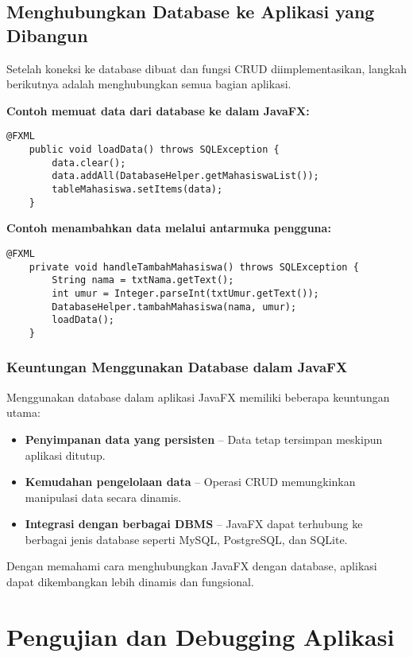 \subsection{Menghubungkan Database ke Aplikasi yang Dibangun}

Setelah koneksi ke database dibuat dan fungsi CRUD diimplementasikan, langkah berikutnya adalah menghubungkan semua bagian aplikasi.

\textbf{Contoh memuat data dari database ke dalam JavaFX:}
\begin{lstlisting}[style=JavaStyle, caption=Memuat data dari database ke TableView]
	@FXML
	public void loadData() throws SQLException {
		data.clear();
		data.addAll(DatabaseHelper.getMahasiswaList());
		tableMahasiswa.setItems(data);
	}
\end{lstlisting}

\textbf{Contoh menambahkan data melalui antarmuka pengguna:}
\begin{lstlisting}[style=JavaStyle, caption=Menambahkan data melalui UI]
	@FXML
	private void handleTambahMahasiswa() throws SQLException {
		String nama = txtNama.getText();
		int umur = Integer.parseInt(txtUmur.getText());
		DatabaseHelper.tambahMahasiswa(nama, umur);
		loadData();
	}
\end{lstlisting}

\subsubsection{Keuntungan Menggunakan Database dalam JavaFX}

Menggunakan database dalam aplikasi JavaFX memiliki beberapa keuntungan utama:
\begin{itemize}
	\item \textbf{Penyimpanan data yang persisten} – Data tetap tersimpan meskipun aplikasi ditutup.
	\item \textbf{Kemudahan pengelolaan data} – Operasi CRUD memungkinkan manipulasi data secara dinamis.
	\item \textbf{Integrasi dengan berbagai DBMS} – JavaFX dapat terhubung ke berbagai jenis database seperti MySQL, PostgreSQL, dan SQLite.
\end{itemize}

Dengan memahami cara menghubungkan JavaFX dengan database, aplikasi dapat dikembangkan lebih dinamis dan fungsional.

\section{Pengujian dan Debugging Aplikasi}

